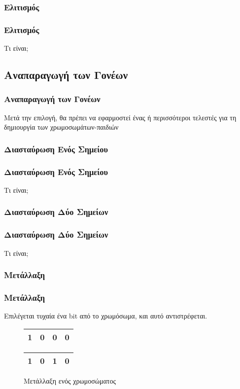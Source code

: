 \documentclass[xetex,mathserif,serif,14pt]{beamer}
\begin{document}
\subsubsection*{Ελιτισμός}

\begin{frame}
\frametitle{Ελιτισμός}
Τι είναι;
\end{frame}

\subsection{Αναπαραγωγή των Γονέων}

\begin{frame}
\frametitle{Αναπαραγωγή των Γονέων}
Μετά την επιλογή, θα πρέπει να εφαρμοστεί ένας ή περισσότεροι τελεστές για τη δημιουργία των χρωμοσωμάτων-παιδιών
\end{frame}

\subsubsection{Διασταύρωση Ενός Σημείου}

\begin{frame}
\frametitle{Διασταύρωση Ενός Σημείου}
Τι είναι;
\end{frame}

\subsubsection{Διασταύρωση Δύο Σημείων}

\begin{frame}
\frametitle{Διασταύρωση Δύο Σημείων}
Τι είναι;
\end{frame}

\subsubsection{Μετάλλαξη}

\begin{frame}
\frametitle{Μετάλλαξη}
Επιλέγεται τυχαία ένα bit από το χρωμόσωμα, και αυτό αντιστρέφεται.

\begin{figure}
    \begin{tabular}{|c|c|c|c|}
        \hline
        1 & 0 & 0 & 0\\
        \hline
    \end{tabular}
    \begin{tabular}{|c|c|c|c|}
        \hline
        1 & 0 & 1 & 0\\
        \hline
    \end{tabular}
    \caption{Μετάλλαξη ενός χρωμοσώματος}
    \label{fig_mutation}
\end{figure}
\end{frame}
\end{document}
